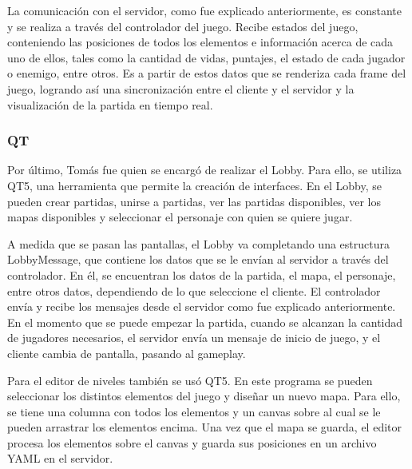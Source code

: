 \documentclass[titlepage,a4paper]{article}
\newcounter{subsubsubsection}[subsubsection]
\begin{document}
La comunicación con el servidor, como fue explicado anteriormente, es constante y se realiza a través del controlador del juego. Recibe estados del juego, conteniendo las posiciones de todos los elementos e información acerca de cada uno de ellos, tales como la cantidad de vidas, puntajes, el estado de cada jugador o enemigo, entre otros. Es a partir de estos datos que se renderiza cada frame del juego, logrando así una sincronización entre el cliente y el servidor y la visualización de la partida en tiempo real.

\subsubsection{QT}

Por último, Tomás fue quien se encargó de realizar el Lobby. Para ello, se utiliza QT5, una herramienta que permite la creación de interfaces. En el Lobby, se pueden crear partidas, unirse a partidas, ver las partidas disponibles, ver los mapas disponibles y seleccionar el personaje con quien se quiere jugar.

A medida que se pasan las pantallas, el Lobby va completando una estructura LobbyMessage, que contiene los datos que se le envían al servidor a través del controlador. En él, se encuentran los datos de la partida, el mapa, el personaje, entre otros datos, dependiendo de lo que seleccione el cliente. El controlador envía y recibe los mensajes desde el servidor como fue explicado anteriormente. En el momento que se puede empezar la partida, cuando se alcanzan la cantidad de jugadores necesarios, el servidor envía un mensaje de inicio de juego, y el cliente cambia de pantalla, pasando al gameplay.

Para el editor de niveles también se usó QT5. En este programa se pueden seleccionar los distintos elementos del juego y diseñar un nuevo mapa. Para ello, se tiene una columna con todos los elementos y un canvas sobre al cual se le pueden arrastrar los elementos encima. Una vez que el mapa se guarda, el editor procesa los elementos sobre el canvas y guarda sus posiciones en un archivo YAML en el servidor. 
\end{document}
